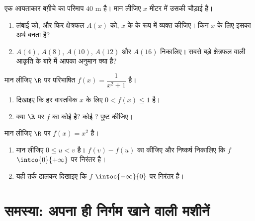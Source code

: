 \begin{exercise}[$\star\star$]\label{exo:g10:functions:8}
एक आयताकार बग़ीचे का परिमाप $40$ m है। मान लीजिए $x$ मीटर में उसकी
चौड़ाई है।
\begin{enumerate}
  \item लंबाई को, और फिर क्षेत्रफल $A(x)$ को, $x$ के  के रूप में
        व्यक्त कीजिए। किन $x$ के लिए इसका अर्थ बनता है?
  \item $A(4)$, $A(8)$, $A(10)$, $A(12)$ और $A(16)$ निकालिए। सबसे बड़े क्षेत्रफल
        वाली आकृति के बारे में आपका अनुमान क्या है?
\end{enumerate}
\end{exercise}

\begin{exercise}[$\star\star$]\label{exo:g10:functions:9}
मान लीजिए $\R$ पर परिभाषित $f(x) = \dfrac{1}{x^2 + 1}$ है।
\begin{enumerate}
  \item दिखाइए कि हर वास्तविक $x$ के लिए $0 < f(x) \leq 1$ है।
  \item क्या $\R$ पर $f$ का कोई  है? कोई ? पुष्ट कीजिए।
\end{enumerate}
\end{exercise}

\begin{exercise}[$\star\star\star$]\label{exo:g10:functions:10}
मान लीजिए $\R$ पर $f(x) = x^2$ है।
\begin{enumerate}
  \item मान लीजिए $0 \leq u < v$ है। $f(v) - f(u)$ का  कीजिए और निष्कर्ष निकालिए
        कि $f$ $\intco{0}{+\infty}$ पर निरंतर  है।
  \item यही तर्क ढालकर दिखाइए कि $f$ $\intoc{-\infty}{0}$ पर निरंतर  है।
\end{enumerate}
\end{exercise}

\section{समस्या: अपना ही निर्गम खाने वाली मशीनें}

